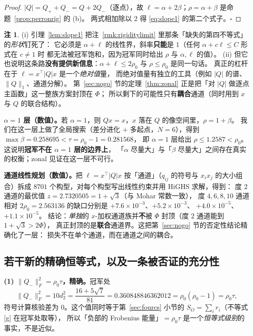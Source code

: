 \documentclass[UTF8,11pt]{ctexart}
\theoremstyle{definition}
\newtheorem{remark}[theorem]{注}
\begin{document}
\begin{proof}
$|Q|=Q_++Q_-=Q+2Q_-$（逐点），故 $\ell=\alpha+2\beta$；$\rho=\alpha+\beta$ 是命题~\ref{prop:perronrig} 的 (b)。
两式相加除以 $2$ 得 \eqref{eq:slope1} 的第二个式子。$\square$
\end{proof}

\begin{remark}\label{rmk:slope1read}
(i) 引理~\ref{lem:slope1} 把注~\ref{rmk:rigiditylimit} 里那条「缺失的第四不等式」的\emph{形状}钉死了：
它必须是 $\alpha+\ell$ 的线性界，斜率\textbf{只能}是 $1$（任何 $\alpha+c\ell\le C$ 形式在 $c\ne1$ 时
都无法被冠军饱和，因为冠军同时给出 $\rho$ 与 $\alpha,\ell$ 的值）。
(ii) 但它也说明这条路\textbf{没有提供新信息}：$\alpha+\ell\le2\rho_0$ 与 $\rho\le\rho_0$ 是同一句话。
真正的杠杆在于 $\ell=x^\top|Q|x$ 是一个\emph{绝对值}量，
而绝对值量有独立的工具（例如 $|Q|$ 的谱、$\|Q\|_1$、通道分解）。
第~\ref{sec:nogo} 节的定理~\ref{thm:zonal} 正是把「对 $|Q|$ 做逐点主函数」这一整族方案封顶在 $\Phi$；
所以剩下的可能性只有\textbf{耦合}通道（同时用到 $x$ 与 $Q$ 的联合结构）。
\end{remark}

\textbf{$\alpha=1$ 层（数值）。}若 $\alpha=1$，则 $Qx=x$，$x$ 落在 $Q$ 的像空间里，$\rho=1+\beta$。
我们在这一层上做了全局搜索（差分进化 $+$ 多起点，$N=6$），得到 $\max\beta=0.258695<\tau=\rho_0-1=0.281568$，
即 $\alpha=1$ 层给出 $\rho\le1.2587<\rho_0$。这说明\textbf{冠军不在 $\alpha=1$ 层的边界上}，
「$\alpha$ 尽量大」与「$\beta$ 尽量大」之间存在真实的权衡；zonal 见证在这一层不可行。

\textbf{通道线性规划（数值）。}把 $\ell=x^\top|Q|x$ 按「通道」（$q_{ij}$ 的符号与 $x_ix_j$ 的大小组合）拆成
$8701$ 个构型，对每个构型写出线性约束并用 HiGHS 求解，得到：
度 $2$ 通道的最优值 $z=2.7320505=1+\sqrt3$（与 Mohar 常数一致），
度 $4,6,8,10$ 通道相对 $2\rho_0=2.563136$ 的缺口分别是 $+7.6\times10^{-3}$、$+5.2\times10^{-3}$、
$+4.0\times10^{-5}$、$+1.1\times10^{-5}$。
结论：\emph{单独}的 $x$-加权通道族并\textbf{不}被 $\Phi$ 封顶（度 $2$ 通道能到 $1+\sqrt3>2\Phi$），
真正封顶的是\textbf{联合}通道界。这把第~\ref{sec:nogo} 节的否定性结论精确化了一层：
损失不在单个通道，而在通道之间的耦合。

\subsection{若干新的精确恒等式，以及一条被否证的充分性}\label{sec:miscid}

\textbf{(1) $\|Q_-\|_F^2=\rho_0\tau$，精确。}冠军处
\[
\|Q_-\|_F^2=10d_2^2=\frac{16+5\sqrt7}{81}=0.360848846362012=\rho_0(\rho_0-1)=\rho_0\tau ,
\]
符号计算核验差为 $0$。这个值同时等于第~\ref{sec:fourcs} 小节的 $S_O=\sum_ir_i$（不等式 [g] 在冠军处取等），
所以「负部的 Frobenius 能量」$=\rho_0\tau$ 是一个\emph{恒等式级别}的事实，不是近似。
\end{document}
